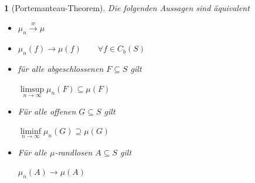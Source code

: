 \documentclass[10pt,a4paper]{report}
\numberwithin{equation}{section}
\numberwithin{figure}{section}
\theoremstyle{plain}
\theoremstyle{definition}
\theoremstyle{remark}
\theoremstyle{plain}
\newtheorem{prop}[thm]{\protect\propositionname}
\providecommand{\propositionname}{Satz}
\newcommand{\1}{ \mathbb{1} } %
\begin{document}
\begin{prop}[Portemanteau-Theorem] 
  Die folgenden Aussagen sind äquivalent
  \begin{itemize}
  \item[1)] $\mu_n \overset{w}{\to} \mu$
  \item[2)] $\mu_n(f) \to \mu(f) \qquad \forall f \in C_b(S)$
  \item[3)] für alle abgeschlossenen $F \subseteq S$ gilt
    \begin{center}
      $\limsup\limits_{n \to \infty} \mu_n(F) \subseteq \mu(F)$
    \end{center}
  \item[4)] Für alle offenen $G \subseteq S$ gilt
    \begin{center}
      $\liminf\limits_{n \to \infty}\mu_n(G) \supseteq \mu(G)$
    \end{center}
  \item[5)] Für alle $\mu$-randlosen $A \subseteq S$ gilt
    \begin{center}
      $\mu_n(A) \to \mu(A)$
    \end{center}
  \end{itemize}
\end{prop}
\end{document}
